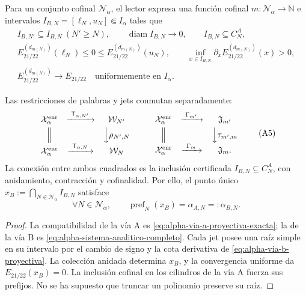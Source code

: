 Para un conjunto cofinal \(\mathcal N_\alpha\), el lector expresa una función
cofinal \(m:\mathcal N_\alpha\to\mathbb N\) e intervalos
\(I_{B,N}=[\ell_N,u_N]\Subset I_\alpha\) tales que
\begin{equation}
\begin{gathered}
 I_{B,N'}\subseteq I_{B,N}\ (N'\ge N),\qquad
 \operatorname{diam}I_{B,N}\longrightarrow0,\qquad
 I_{B,N}\subseteq C_N^A,\\
 E_{21/22}^{(d_{m(N)})}(\ell_N)\le0\le
 E_{21/22}^{(d_{m(N)})}(u_N),\qquad
 \inf_{x\in I_{B,N}}\partial_xE_{21/22}^{(d_{m(N)})}(x)>0,\\
 E_{21/22}^{(d_{m(N)})}\longrightarrow E_{21/22}
 \quad\text{uniformemente en }I_\alpha .
\end{gathered}
 \tag{A4}
 \label{eq:alpha-via-b-proyectiva}
\end{equation}

\begin{proposition}
\label{prop:alpha-cuadrados-compatibilidad-historico-rev04}
Las restricciones de palabras y jets conmutan separadamente:
\[
\begin{array}{ccc}
 \mathcal X_\alpha^{\mathrm{enr}}&
 \xrightarrow{\ \mathsf T_{\alpha,N'}\ }&\mathcal W_{N'}\\[1mm]
 \Big\Vert&&\Big\downarrow\rho_{N',N}\\[1mm]
 \mathcal X_\alpha^{\mathrm{enr}}&
 \xrightarrow{\ \mathsf T_{\alpha,N}\ }&\mathcal W_N
\end{array}
\qquad
\begin{array}{ccc}
 \mathcal X_\alpha^{\mathrm{enr}}&
 \xrightarrow{\ \Gamma_{m'}\ }&\mathfrak J_{m'}\\[1mm]
 \Big\Vert&&\Big\downarrow\tau_{m',m}\\[1mm]
 \mathcal X_\alpha^{\mathrm{enr}}&
 \xrightarrow{\ \Gamma_m\ }&\mathfrak J_m .
\end{array}
 \tag{A5}
\]
La conexión entre ambos cuadrados es la inclusión certificada
\(I_{B,N}\subseteq C_N^A\), con anidamiento, contracción y cofinalidad. Por
ello, el punto único
\(x_B:=\bigcap_{N\in\mathcal N_\alpha}I_{B,N}\) satisface
\begin{equation}
 \forall N\in\mathcal N_\alpha,\qquad
 \operatorname{pref}_N(x_B)=\alpha_{A,N}=:\alpha_{B,N}.
 \tag{A6}
 \label{eq:alpha-igualdad-cada-nivel}
\end{equation}
\end{proposition}

\begin{proof}
La compatibilidad de la vía A es
\eqref{eq:alpha-via-a-proyectiva-exacta}; la de la vía B es
\eqref{eq:alpha-sistema-analitico-completo}. Cada jet posee una raíz simple
en su intervalo por el cambio de signo y la cota derivativa de
\eqref{eq:alpha-via-b-proyectiva}. La colección anidada determina \(x_B\), y la
convergencia uniforme da \(E_{21/22}(x_B)=0\). La inclusión cofinal en los
cilindros de la vía A fuerza sus prefijos. No se ha supuesto que truncar un
polinomio preserve su raíz.
\end{proof}

